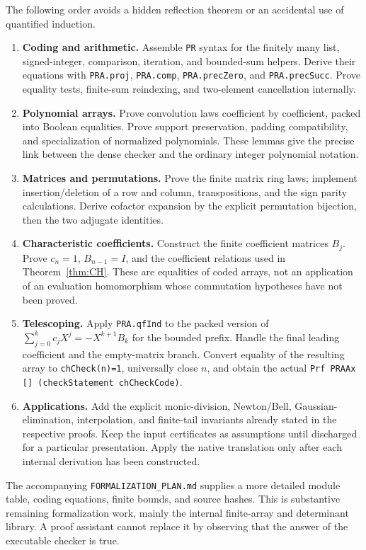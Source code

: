 The following order avoids a hidden reflection theorem or an accidental
use of quantified induction.
\begin{enumerate}
\item \textbf{Coding and arithmetic.} Assemble \texttt{PR} syntax for
the finitely many list, signed-integer, comparison, iteration, and
bounded-sum helpers. Derive their equations with
\texttt{PRA.proj}, \texttt{PRA.comp}, \texttt{PRA.precZero}, and
\texttt{PRA.precSucc}. Prove equality tests, finite-sum reindexing, and
two-element cancellation internally.
\item \textbf{Polynomial arrays.} Prove convolution laws coefficient by
coefficient, packed into Boolean equalities. Prove support preservation,
padding compatibility, and specialization of normalized polynomials.
These lemmas give the precise link between the dense checker and the
ordinary integer polynomial notation.
\item \textbf{Matrices and permutations.} Prove the finite matrix ring
laws; implement insertion/deletion of a row and column, transpositions,
and the sign parity calculations. Derive cofactor expansion by the
explicit permutation bijection, then the two adjugate identities.
\item \textbf{Characteristic coefficients.} Construct the finite
coefficient matrices $B_j$. Prove $c_n=1$, $B_{n-1}=I$, and the
coefficient relations used in Theorem~\ref{thm:CH}. These are equalities
of coded arrays, not an application of an evaluation homomorphism whose
commutation hypotheses have not been proved.
\item \textbf{Telescoping.} Apply \texttt{PRA.qfInd} to the packed
version of
$\sum_{j=0}^{k}c_jX^j=-X^{k+1}B_k$ for the bounded prefix.
Handle the final leading coefficient and the empty-matrix branch.
Convert equality of the resulting array to \texttt{chCheck(n)=1},
universally close $n$, and obtain the actual
\texttt{Prf PRAAx [] (checkStatement chCheckCode)}.
\item \textbf{Applications.} Add the explicit monic-division,
Newton/Bell, Gaussian-elimination, interpolation, and finite-tail
invariants already stated in the respective proofs. Keep the input
certificates as assumptions until discharged for a particular
presentation. Apply the native translation only after each internal
derivation has been constructed.
\end{enumerate}

The accompanying \texttt{FORMALIZATION\_PLAN.md} supplies a more detailed
module table, coding equations, finite bounds, and source hashes. This
is substantive remaining formalization work, mainly the internal
finite-array and determinant library. A proof assistant cannot replace
it by observing that the answer of the executable checker is true.

